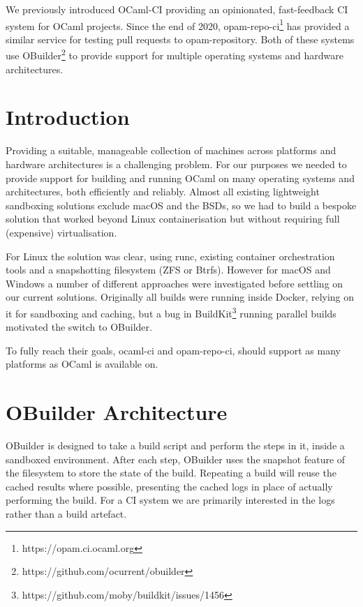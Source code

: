 \documentclass[manuscript,screen,review,sigplan]{acmart}
\begin{document}
We previously introduced OCaml-CI \cite{ocamlci:2020} providing an opinionated, fast-feedback CI system for OCaml projects. Since the end of 2020, opam-repo-ci\footnote{https://opam.ci.ocaml.org} has provided a similar service for testing pull requests to opam-repository. Both of these systems use OBuilder\footnote{https://github.com/ocurrent/obuilder} to provide support for multiple operating systems and hardware architectures.

\section{Introduction}

Providing a suitable, manageable collection of machines across platforms and hardware 
architectures is a challenging problem. For our purposes we needed to provide support for 
building and running OCaml on many operating systems and architectures, both efficiently 
and reliably. Almost all existing lightweight sandboxing solutions exclude macOS and the BSDs, 
so we had to build a bespoke solution that worked beyond Linux containerisation but without 
requiring full (expensive) virtualisation.

For Linux the solution was clear, using runc, existing container orchestration tools and a snapshotting filesystem (ZFS or Btrfs). However for macOS and Windows a number of different approaches were investigated before settling on our current solutions. Originally all builds were running inside Docker, relying on it for sandboxing and caching, but a bug in BuildKit\footnote{https://github.com/moby/buildkit/issues/1456} running parallel builds motivated the switch to OBuilder.

To fully reach their goals, ocaml-ci and opam-repo-ci, should support as many platforms as OCaml is available on.

\section{OBuilder Architecture}

OBuilder is designed to take a build script and perform the steps in it, inside a sandboxed environment. After each step, OBuilder uses the snapshot feature of the filesystem to store the state of the build. Repeating a build will reuse the cached results where possible, presenting the cached logs in place of actually performing the build. For a CI system we are primarily interested in the logs rather than a build artefact.
\end{document}

